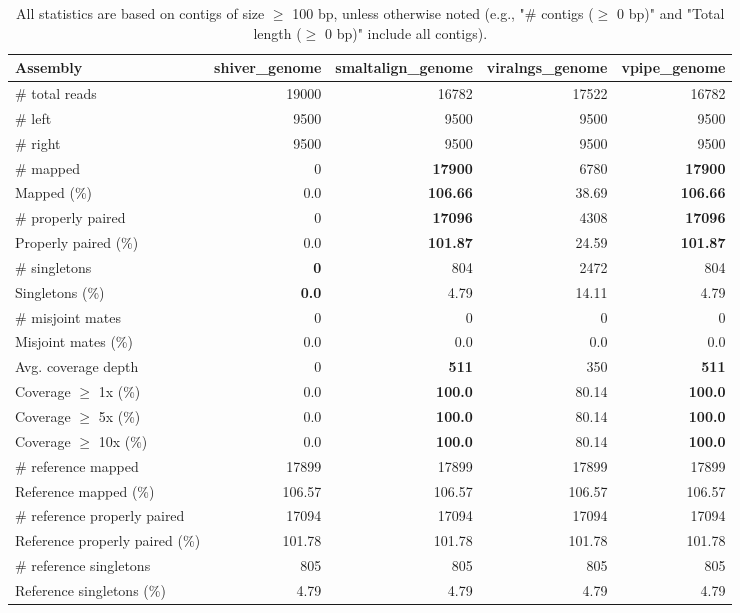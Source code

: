 \documentclass[12pt,a4paper]{article}
\begin{document}
\begin{table}[ht]
\begin{center}
\caption{All statistics are based on contigs of size $\geq$ 100 bp, unless otherwise noted (e.g., "\# contigs ($\geq$ 0 bp)" and "Total length ($\geq$ 0 bp)" include all contigs).}
\begin{tabular}{|l*{4}{|r}|}
\hline
Assembly & shiver\_genome & smaltalign\_genome & viralngs\_genome & vpipe\_genome \\ \hline
\# total reads & 19000 & 16782 & 17522 & 16782 \\ \hline
\# left & 9500 & 9500 & 9500 & 9500 \\ \hline
\# right & 9500 & 9500 & 9500 & 9500 \\ \hline
\# mapped & 0 & {\bf 17900} & 6780 & {\bf 17900} \\ \hline
Mapped (\%) & 0.0 & {\bf 106.66} & 38.69 & {\bf 106.66} \\ \hline
\# properly paired & 0 & {\bf 17096} & 4308 & {\bf 17096} \\ \hline
Properly paired (\%) & 0.0 & {\bf 101.87} & 24.59 & {\bf 101.87} \\ \hline
\# singletons & {\bf 0} & 804 & 2472 & 804 \\ \hline
Singletons (\%) & {\bf 0.0} & 4.79 & 14.11 & 4.79 \\ \hline
\# misjoint mates & 0 & 0 & 0 & 0 \\ \hline
Misjoint mates (\%) & 0.0 & 0.0 & 0.0 & 0.0 \\ \hline
Avg. coverage depth & 0 & {\bf 511} & 350 & {\bf 511} \\ \hline
Coverage $\geq$ 1x (\%) & 0.0 & {\bf 100.0} & 80.14 & {\bf 100.0} \\ \hline
Coverage $\geq$ 5x (\%) & 0.0 & {\bf 100.0} & 80.14 & {\bf 100.0} \\ \hline
Coverage $\geq$ 10x (\%) & 0.0 & {\bf 100.0} & 80.14 & {\bf 100.0} \\ \hline
\# reference mapped & 17899 & 17899 & 17899 & 17899 \\ \hline
Reference mapped (\%) & 106.57 & 106.57 & 106.57 & 106.57 \\ \hline
\# reference properly paired & 17094 & 17094 & 17094 & 17094 \\ \hline
Reference properly paired (\%) & 101.78 & 101.78 & 101.78 & 101.78 \\ \hline
\# reference singletons & 805 & 805 & 805 & 805 \\ \hline
Reference singletons (\%) & 4.79 & 4.79 & 4.79 & 4.79 \\ \hline

\end{tabular}
\end{center}
\end{table}
\end{document}

